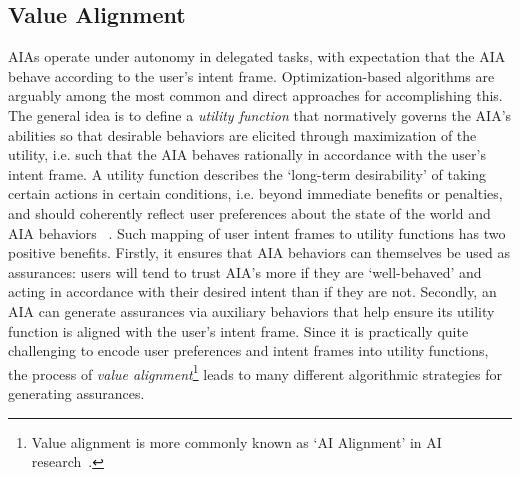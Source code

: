

\subsection{Value Alignment} \label{sec:value_alignment}
AIAs operate under autonomy in delegated tasks, with expectation that the AIA behave according to the user's intent frame. 
Optimization-based algorithms are arguably among the most common and direct approaches for accomplishing this. 
The general idea is to define a \emph{utility function} that normatively governs the AIA's abilities so that desirable behaviors are elicited through maximization of the utility, i.e. such that the AIA behaves rationally in accordance with the user's intent frame. 
A utility function describes the `long-term desirability' of taking certain actions in certain conditions, i.e. beyond immediate benefits or penalties, and should coherently reflect user preferences about the state of the world and AIA behaviors ~\cite{Russell2010-wv}. 
Such mapping of user intent frames to utility functions has two positive benefits. 
Firstly, it ensures that AIA behaviors can themselves be used as assurances: users will tend to trust AIA's more if they are `well-behaved' and acting in accordance with their desired intent than if they are not. 
Secondly, an AIA can generate assurances via auxiliary behaviors that help ensure its utility function is aligned with the user's intent frame.  Since it is practically quite challenging to encode user preferences and intent frames into utility functions, the process of \emph{value alignment}\footnote{Value alignment is more commonly known as `AI Alignment' in AI research~\cite{Yudkowsky2001-hb,Bensinger2014-ul}.} leads to many different algorithmic strategies for generating assurances. 

